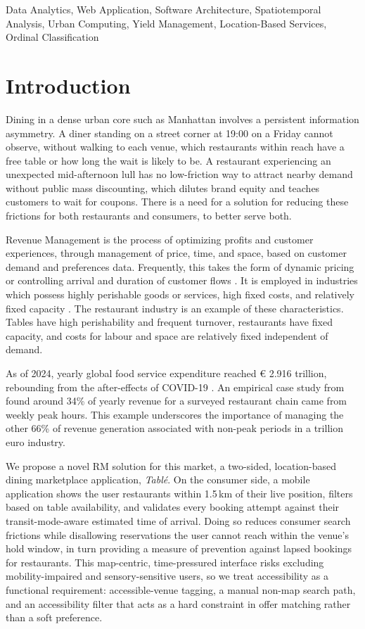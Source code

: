 \documentclass[conference]{IEEEtran}
\begin{document}
\begin{IEEEkeywords}
Data Analytics, Web Application, Software Architecture, Spatiotemporal Analysis, Urban Computing, Yield Management, Location-Based Services, Ordinal Classification
\end{IEEEkeywords}

\section{Introduction}

Dining in a dense urban core such as Manhattan involves a persistent information asymmetry. A diner standing on a street corner at 19:00 on a Friday cannot observe, without walking to each venue, which restaurants within reach have a free table or how long the wait is likely to be. A restaurant experiencing an unexpected mid-afternoon lull has no low-friction way to attract nearby demand without public mass discounting, which dilutes brand equity and teaches customers to wait for coupons. There is a need for a solution for reducing these frictions for both restaurants and consumers, to better serve both.

Revenue Management is the process of optimizing profits and customer experiences, through management of price, time, and space, based on customer demand and preferences data. Frequently, this takes the form of dynamic pricing or controlling arrival and duration of customer flows \cite{kimes2004restaurant}. It is employed in industries which possess highly perishable goods or services, high fixed costs, and relatively fixed capacity \cite{kimes2015revenue}.  The restaurant industry is an example of these characteristics. Tables have high perishability and frequent turnover, restaurants have fixed capacity, and costs for labour and space are relatively fixed independent of demand.

As of 2024, yearly global food service expenditure reached € 2.916 trillion, rebounding from the after-effects of COVID-19 \cite{deloitte2025foodservice}.  An empirical case study from \cite{kimes2004sherylrestaurant} found around 34\% of yearly revenue for a surveyed restaurant chain came from weekly peak hours. This example underscores the importance of managing the other 66\% of revenue generation associated with non-peak periods in a trillion euro industry.

We propose a novel RM solution for this market, a two-sided, location-based dining marketplace application, \textit{Tabl\'{e}}. On the consumer side, a mobile application shows the user restaurants within 1.5\,km of their live position, filters based on table availability, and validates every booking attempt against their transit-mode-aware estimated time of arrival. Doing so reduces consumer search frictions while disallowing reservations the user cannot reach within the venue's hold window, in turn providing a measure of prevention against lapsed bookings for restaurants.  This map-centric, time-pressured interface risks excluding mobility-impaired and sensory-sensitive users, so we treat accessibility as a functional requirement: accessible-venue tagging, a manual non-map search path, and an accessibility filter that acts as a hard constraint in offer matching rather than a soft preference.
\end{document}
